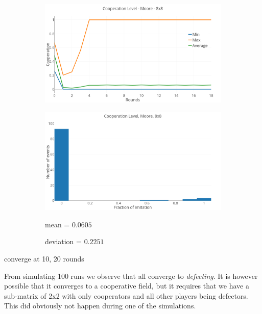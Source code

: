 \documentclass[a4paper, 11pt]{article}
\begin{document}
\begin{figure}[H]
\begin{subfigure}{.75\textwidth}
	\includegraphics[width=1\linewidth]{PDMoore8x8}
\end{subfigure}

\begin{subfigure}{.75\textwidth}
	\includegraphics[width=1\linewidth]{PDMoore8x8HG}
\end{subfigure}%
\begin{subfigure}{.25\textwidth}
	mean = $0.0605$
	
	deviation = $0.2251$
\end{subfigure}

\end{figure}

converge at 10, 20 rounds

	From simulating 100 runs we observe that all converge to \textit{defecting}. It is however possible that it converges to a cooperative field, but it requires that we have a sub-matrix of 2x2 with only cooperators and all other players being defectors. This did obviously not happen during one of the simulations.
\end{document}
